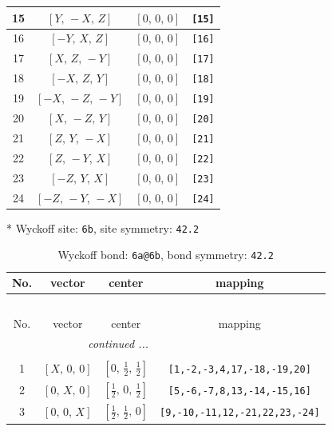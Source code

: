 \documentclass[fleqn,8pt]{jsarticle}
\begin{document}
\begin{longtable}{cccc}
15 & $\left[ Y,\, - X,\, Z \right]$ & $\left[ 0,\, 0,\, 0 \right]$ & {\tt [15]} \\ \hline
16 & $\left[ - Y,\, X,\, Z \right]$ & $\left[ 0,\, 0,\, 0 \right]$ & {\tt [16]} \\ \hline
17 & $\left[ X,\, Z,\, - Y \right]$ & $\left[ 0,\, 0,\, 0 \right]$ & {\tt [17]} \\ \hline
18 & $\left[ - X,\, Z,\, Y \right]$ & $\left[ 0,\, 0,\, 0 \right]$ & {\tt [18]} \\ \hline
19 & $\left[ - X,\, - Z,\, - Y \right]$ & $\left[ 0,\, 0,\, 0 \right]$ & {\tt [19]} \\ \hline
20 & $\left[ X,\, - Z,\, Y \right]$ & $\left[ 0,\, 0,\, 0 \right]$ & {\tt [20]} \\ \hline
21 & $\left[ Z,\, Y,\, - X \right]$ & $\left[ 0,\, 0,\, 0 \right]$ & {\tt [21]} \\ \hline
22 & $\left[ Z,\, - Y,\, X \right]$ & $\left[ 0,\, 0,\, 0 \right]$ & {\tt [22]} \\ \hline
23 & $\left[ - Z,\, Y,\, X \right]$ & $\left[ 0,\, 0,\, 0 \right]$ & {\tt [23]} \\ \hline
24 & $\left[ - Z,\, - Y,\, - X \right]$ & $\left[ 0,\, 0,\, 0 \right]$ & {\tt [24]} \\
\end{longtable}
* Wyckoff site: {\tt 6b}, site symmetry: {\tt 42.2}
\renewcommand{\arraystretch}{1.2}
\begin{longtable}{cccc}
\caption{Wyckoff bond: {\tt 6a@6b}, bond symmetry: {\tt 42.2}}
 \\
 \hline \hline
No. & vector & center & mapping \\ \hline \endfirsthead

\multicolumn{3}{l}{\tablename\ \thetable{}} \\
 \hline \hline
No. & vector & center & mapping \\ \hline \endhead

 \hline \hline
\multicolumn{3}{r}{\footnotesize\it continued ...} \\ \endfoot

 \hline \hline
\multicolumn{3}{r}{} \\ \endlastfoot

1 & $\left[ X,\, 0,\, 0 \right]$ & $\left[ 0,\, \frac{1}{2},\, \frac{1}{2} \right]$ & {\tt [1,-2,-3,4,17,-18,-19,20]} \\ \hline
2 & $\left[ 0,\, X,\, 0 \right]$ & $\left[ \frac{1}{2},\, 0,\, \frac{1}{2} \right]$ & {\tt [5,-6,-7,8,13,-14,-15,16]} \\ \hline
3 & $\left[ 0,\, 0,\, X \right]$ & $\left[ \frac{1}{2},\, \frac{1}{2},\, 0 \right]$ & {\tt [9,-10,-11,12,-21,22,23,-24]} \\
\end{longtable}
\end{document}
